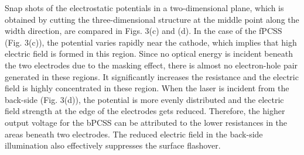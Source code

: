 \documentclass[final,5p,times,twocolumn]{elsarticle}
\begin{document}

   Snap shots of the electrostatic potentials in a two-dimensional 
plane, which is obtained by cutting the three-dimensional structure at the middle point along the width direction, are compared in Figs. 3(c) and (d). 
   In the case of the fPCSS (Fig. 3(c)), the potential varies rapidly near the cathode, which implies that high electric field is formed in this region.   
   Since no optical energy is incident beneath the two electrodes due to the masking effect, there is almost no electron-hole pair generated in these regions.
   It significantly increases the resistance and the electric field is highly concentrated in these region.     
   When the laser is incident from the back-side (Fig. 3(d)), the potential is more evenly distributed and the electric field strength at the edge of the electrodes gets reduced.
   Therefore, the higher output voltage for the bPCSS can be attributed to the lower resistances in the areas beneath two electrodes.
   The reduced electric field in the back-side illumination also effectively suppresses the surface flashover.   






\end{document}
